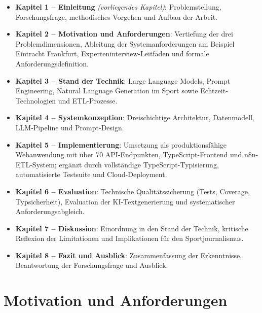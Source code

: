 \documentclass[12pt,a4paper,notitlepage,ngerman]{report}
\begin{document}
\begin{itemize}
    \item \textbf{Kapitel 1 – Einleitung} \textit{(vorliegendes Kapitel)}: Problemstellung, Forschungsfrage, methodisches Vorgehen und Aufbau der Arbeit.
    
    \item \textbf{Kapitel 2 – Motivation und Anforderungen}: Vertiefung der drei Problemdimensionen, Ableitung der Systemanforderungen am Beispiel Eintracht Frankfurt, Experteninterview-Leitfaden und formale Anforderungsdefinition.
    
    \item \textbf{Kapitel 3 – Stand der Technik}: Large Language Models, Prompt Engineering, Natural Language Generation im Sport sowie Echtzeit-Technologien und ETL-Prozesse.
    
    \item \textbf{Kapitel 4 – Systemkonzeption}: Dreischichtige Architektur, Datenmodell, LLM-Pipeline und Prompt-Design.
    
    \item \textbf{Kapitel 5 – Implementierung}: Umsetzung als produktionsfähige Webanwendung mit über 70 API-Endpunkten, TypeScript-Frontend und n8n-ETL-System; ergänzt durch vollständige TypeScript-Typisierung, automatisierte Testsuite und Cloud-Deployment.
    
    \item \textbf{Kapitel 6 – Evaluation}: Technische Qualitätssicherung (Tests, Coverage, Typsicherheit), Evaluation der KI-Textgenerierung und systematischer Anforderungsabgleich.
    
    \item \textbf{Kapitel 7 – Diskussion}: Einordnung in den Stand der Technik, kritische Reflexion der Limitationen und Implikationen für den Sportjournalismus.
    
    \item \textbf{Kapitel 8 – Fazit und Ausblick}: Zusammenfassung der Erkenntnisse, Beantwortung der Forschungsfrage und Ausblick.
\end{itemize}


\chapter{Motivation und Anforderungen}
\end{document}
